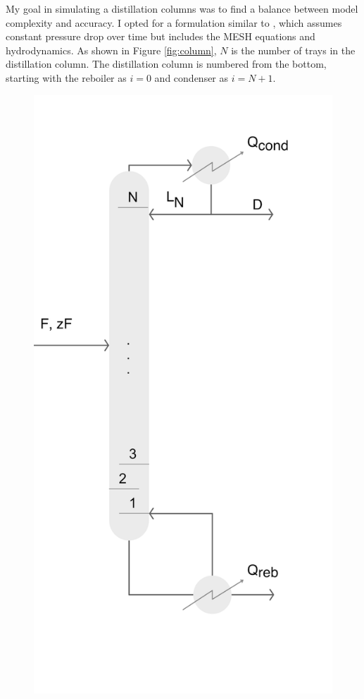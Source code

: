 
My goal in simulating a distillation columns was to find a balance between model complexity and accuracy. I opted for a formulation similar to \citet{Diehl2001}, which assumes constant pressure drop over time but includes the MESH equations and hydrodynamics. As shown in Figure \ref{fig:column}, $N$ is the number of trays in the distillation column. The distillation column is numbered from the bottom, starting with the reboiler as $i=0$ and condenser as $i=N+1$.  

\begin{figure}
    \centering
    \includegraphics{gfx/Chapter06/basic_column.png}

\end{figure}
